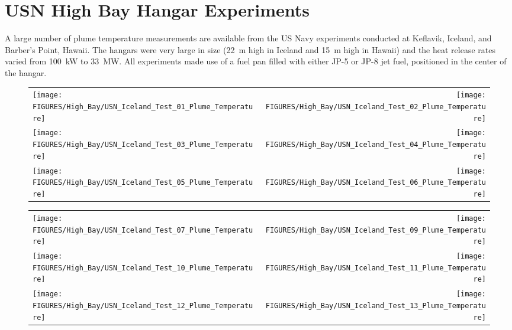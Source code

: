 \clearpage


\section{USN High Bay Hangar Experiments}

\label{USN_Plume}

A large number of plume temperature measurements are available from the US Navy experiments conducted at Keflavik, Iceland, and Barber's Point, Hawaii. The hangars were very large in size (22~m high in Iceland and 15~m high in Hawaii) and the heat release rates varied from 100~kW to 33~MW. All experiments made use of a fuel pan filled with either JP-5 or JP-8 jet fuel, positioned in the center of the hangar.


\begin{figure}[h!]
\begin{tabular*}{\textwidth}{l@{\extracolsep{\fill}}r}
\texttt{[image: FIGURES/High\_Bay/USN\_Iceland\_Test\_01\_Plume\_Temperature]} &
\texttt{[image: FIGURES/High\_Bay/USN\_Iceland\_Test\_02\_Plume\_Temperature]} \\
\texttt{[image: FIGURES/High\_Bay/USN\_Iceland\_Test\_03\_Plume\_Temperature]} &
\texttt{[image: FIGURES/High\_Bay/USN\_Iceland\_Test\_04\_Plume\_Temperature]} \\
\texttt{[image: FIGURES/High\_Bay/USN\_Iceland\_Test\_05\_Plume\_Temperature]} &
\texttt{[image: FIGURES/High\_Bay/USN\_Iceland\_Test\_06\_Plume\_Temperature]} \\
\end{tabular*}
\label{USN_Plume_Iceland_Plume_Temperature}
\end{figure}

\begin{figure}[p]
\begin{tabular*}{\textwidth}{l@{\extracolsep{\fill}}r}
\texttt{[image: FIGURES/High\_Bay/USN\_Iceland\_Test\_07\_Plume\_Temperature]} &
\texttt{[image: FIGURES/High\_Bay/USN\_Iceland\_Test\_09\_Plume\_Temperature]} \\
\texttt{[image: FIGURES/High\_Bay/USN\_Iceland\_Test\_10\_Plume\_Temperature]} &
\texttt{[image: FIGURES/High\_Bay/USN\_Iceland\_Test\_11\_Plume\_Temperature]} \\
\texttt{[image: FIGURES/High\_Bay/USN\_Iceland\_Test\_12\_Plume\_Temperature]} &
\texttt{[image: FIGURES/High\_Bay/USN\_Iceland\_Test\_13\_Plume\_Temperature]} \\
\end{tabular*}
\label{USN_Plume_Iceland_2}
\end{figure}

